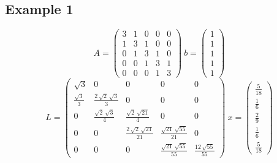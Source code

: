 \documentclass[12pt]{article}
\begin{document}
\subsection{Example 1}
$$A = \left(\begin{array}{ccccc} 3 & 1 & 0 & 0 & 0\\ 1 & 3 & 1 & 0 & 0\\ 0 & 1 & 3 & 1 & 0\\ 0 & 0 & 1 & 3 & 1\\ 0 & 0 & 0 & 1 & 3 \end{array}\right)\ 
b = \left(\begin{array}{c} 1\\ 1\\ 1\\ 1\\ 1 \end{array}\right)$$
$$L = \left(\begin{array}{ccccc} \sqrt{3} & 0 & 0 & 0 & 0\\ \frac{\sqrt{3}}{3} & \frac{2\,\sqrt{2}\,\sqrt{3}}{3} & 0 & 0 & 0\\ 0 & \frac{\sqrt{2}\,\sqrt{3}}{4} & \frac{\sqrt{2}\,\sqrt{21}}{4} & 0 & 0\\ 0 & 0 & \frac{2\,\sqrt{2}\,\sqrt{21}}{21} & \frac{\sqrt{21}\,\sqrt{55}}{21} & 0\\ 0 & 0 & 0 & \frac{\sqrt{21}\,\sqrt{55}}{55} & \frac{12\,\sqrt{55}}{55} \end{array}\right) \
x=\left(\begin{array}{c} \frac{5}{18}\\ \frac{1}{6}\\ \frac{2}{9}\\ \frac{1}{6}\\ \frac{5}{18} \end{array}\right)$$
\end{document}
